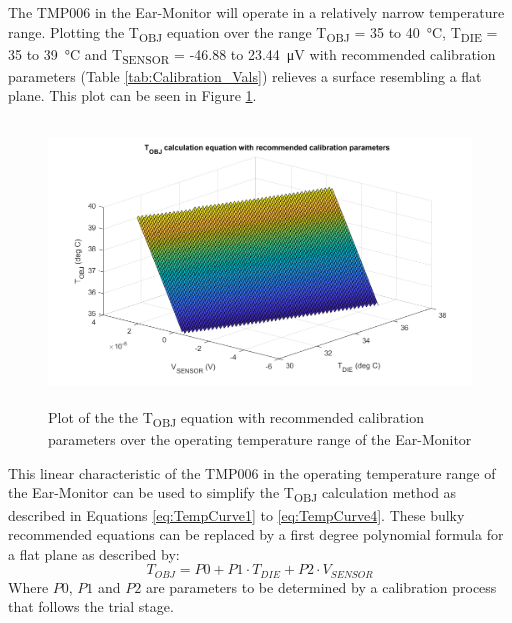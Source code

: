 The TMP006 in the Ear-Monitor will operate in a relatively narrow temperature range. Plotting the T\textsubscript{OBJ} equation over the range T\textsubscript{OBJ} = 35 to \SI{40}{\celsius}, T\textsubscript{DIE} = 35 to \SI{39}{\celsius} and T\textsubscript{SENSOR} = -46.88 to \SI{23.44}{\micro\volt} with recommended calibration parameters (Table \ref{tab:Calibration_Vals}) relieves a surface resembling a flat plane. This plot can be seen in Figure \ref{fig:RecommendedTempCurve}.

\begin{figure}[H]
   \centering
   \includegraphics[width=14cm,height=7.5cm]{figs/RecommendedTempCurve.png}
   \caption{Plot of the the T\textsubscript{OBJ} equation with recommended calibration parameters over the operating temperature range of the Ear-Monitor}
   \label{fig:RecommendedTempCurve}
\end{figure}

This linear characteristic of the TMP006 in the operating temperature range of the Ear-Monitor can be used to simplify the T\textsubscript{OBJ} calculation method as described in Equations \ref{eq:TempCurve1} to \ref{eq:TempCurve4}. These bulky recommended equations can be replaced by a first degree polynomial formula for a flat plane as described by:
\begin{equation}
\label{eq:FlatPlane}
T_{OBJ}=P0+P1\cdot T_{DIE}+P2\cdot V_{SENSOR}
\end{equation}
Where $P0$, $P1$ and $P2$ are parameters to be determined by a calibration process that follows the trial stage.

